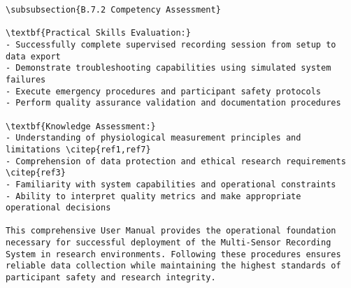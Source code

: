 \begin{verbatim}
\subsubsection{B.7.2 Competency Assessment}

\textbf{Practical Skills Evaluation:}
- Successfully complete supervised recording session from setup to data export
- Demonstrate troubleshooting capabilities using simulated system failures
- Execute emergency procedures and participant safety protocols
- Perform quality assurance validation and documentation procedures

\textbf{Knowledge Assessment:}
- Understanding of physiological measurement principles and limitations \citep{ref1,ref7}
- Comprehension of data protection and ethical research requirements \citep{ref3}
- Familiarity with system capabilities and operational constraints
- Ability to interpret quality metrics and make appropriate operational decisions

This comprehensive User Manual provides the operational foundation necessary for successful deployment of the Multi-Sensor Recording System in research environments. Following these procedures ensures reliable data collection while maintaining the highest standards of participant safety and research integrity.
\end{verbatim}
